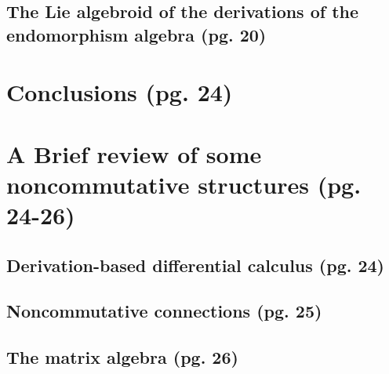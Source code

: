 \documentclass{article}
\begin{document}
\subsection{The Lie algebroid of the derivations of the endomorphism algebra (pg. 20)}

\section{Conclusions (pg. 24)}

\section{A Brief review of some noncommutative structures (pg. 24-26)}

\subsection{Derivation-based differential calculus (pg. 24)}

\subsection{Noncommutative connections (pg. 25)}

\subsection{The matrix algebra (pg. 26)}
\end{document}
